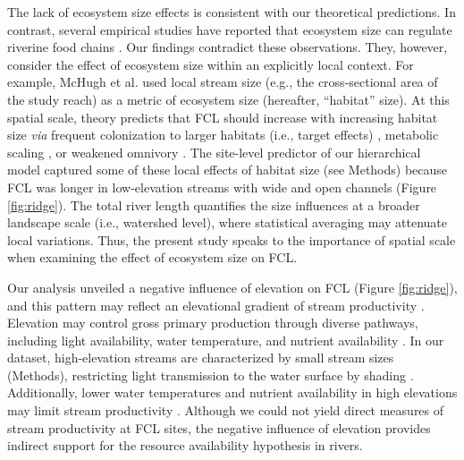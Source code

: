 \documentclass[11pt, class=article, crop=false]{standalone}
\begin{document}
The lack of ecosystem size effects is consistent with our theoretical predictions.
In contrast, several empirical studies have reported that ecosystem size can regulate riverine food chains \citep{mchugh_dual_2010, sabo_role_2010, mcintosh_capacity_2018}.
Our findings contradict these observations.
They, however, consider the effect of ecosystem size within an explicitly local context.
For example, McHugh et al. \citep{mchugh_dual_2010} used local stream size (e.g., the cross-sectional area of the study reach) as a metric of ecosystem size (hereafter, ``habitat'' size).
At this spatial scale, theory predicts that FCL should increase with increasing habitat size \textit{via} frequent colonization to larger habitats (i.e., target effects) \citep{shibasaki_food_2024}, metabolic scaling \citep{mcintosh_capacity_2018}, or weakened omnivory \citep{ward_mechanistic_2017}.
The site-level predictor of our hierarchical model captured some of these local effects of habitat size (see Methods) because FCL was longer in low-elevation streams with wide and open channels (Figure \ref{fig:ridge}).
The total river length quantifies the size influences at a broader landscape scale (i.e., watershed level), where statistical averaging may attenuate local variations. 
Thus, the present study speaks to the importance of spatial scale when examining the effect of ecosystem size on FCL.

Our analysis unveiled a negative influence of elevation on FCL (Figure \ref{fig:ridge}), and this pattern may reflect an elevational gradient of stream productivity \citep{marzolf_ecosystem_2021}.
Elevation may control gross primary production through diverse pathways, including light availability, water temperature, and nutrient availability \citep{marzolf_ecosystem_2021, atkinson_determinants_2018}.
In our dataset, high-elevation streams are characterized by small stream sizes (Methods), restricting light transmission to the water surface by shading \citep{finlay_light-mediated_2011, finlay_human_2013, bernhardt_light_2022}.
Additionally, lower water temperatures and nutrient availability in high elevations may limit stream productivity \citep{demars_temperature_2011}.
Although we could not yield direct measures of stream productivity at FCL sites, the negative influence of elevation provides indirect support for the resource availability hypothesis in rivers.
\end{document}
